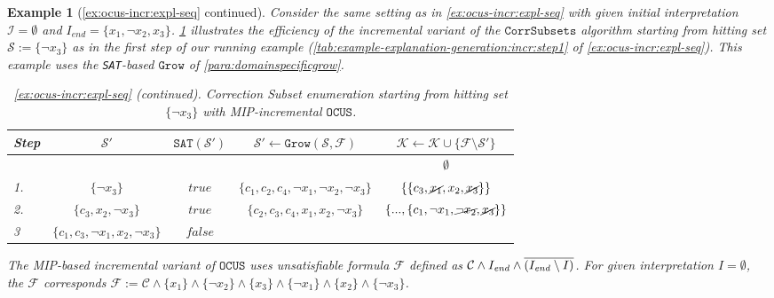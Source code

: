 \documentclass[twoside,11pt]{article}
\newcommand\m[1]{\mathcal{#1}}
\newtheorem{example}{Example}
\newcommand\Iend{\ensuremath{I_\mathit{end} }\xspace}
\newcommand\formula{\ensuremath{\m{F} }\xspace}
\newcommand\formulac{\ensuremath{\m{C} }\xspace}
\newcommand\mm[1]{\ensuremath{#1}\xspace}
\newcommand\call[1]{\mm{\texttt{#1}}}
\newcommand\sat{\texttt{{SAT}}\xspace}
\newcommand\grow{\mm{\call{Grow}}}
\newcommand\comus{\mm{\call{OCUS}}}
\newcommand\corrsubsets{\mm{\call{CorrSubsets}}}
\begin{document}
\begin{example}[\cref{ex:ocus-incr:expl-seq} continued] \label{ex:correction-subset-enum}
	Consider the same setting as in \cref{ex:ocus-incr:expl-seq} with given initial interpretation $\m{I} =\emptyset$ and $\Iend = \{x_1, \lnot x_2, x_3\}$.
	\cref{tab:example-corr-subsets:ocus-incr} illustrates the efficiency of the incremental variant of the \corrsubsets algorithm starting from hitting set $\m{S} := \{\lnot x_3\}$ as in the first step of our running example (\cref{tab:example-explanation-generation:incr:step1} of \cref{ex:ocus-incr:expl-seq}). This example uses the \sat-based \grow of \cref{para:domainspecificgrow}. 
	
	\begin{table}[!h]
		\centering
		\begin{tabular}{lcccc} 
			Step & $\m{S}'$                             & $\sat(\m{S}')$    & $\m{S}' \gets \grow(\m{S}, \formula)$      & $\m{K}  \gets \m{K}  \cup \{  \formula \setminus \m{S}'\}$ \\ 
			\toprule[2pt]
			&    \phantom{$\{ c_1, c_2, x_1, \lnot x_3 \}$}    &    &      & $\emptyset$                                \\\midrule
			1. & $\{ \lnot x_3\}$                    & $\mathit{true}$  & $\{c_1, c_2, c_4, \lnot x_1, \lnot x_2, \lnot x_3 \}$            & $\{ \{c_3, \cancel{x_1}, x_2, \cancel{x_3}\}\}$                                \\\midrule
			2. & $\{c_3, x_2, \lnot x_3\}$ & $\mathit{true}$  & $\{c_2 , c_3, c_4, x_1 , x_2, \lnot x_3 \}$ & $\{ ..., \{c_1, \lnot x_1, \cancel{\lnot x_2}, \cancel{x_3}\}\}$                               \\\midrule
			3 & $\{c_1, c_3, \lnot x_1, x_2, \lnot x_3\}$& $\mathit{false}$  &  &                       \\  
		\end{tabular}
		\caption{\textit{\cref{ex:ocus-incr:expl-seq} (continued)}. Correction Subset enumeration starting from hitting set $\{ \lnot x_3\}$ with \emph{MIP-incremental} \comus.}
		\label{tab:example-corr-subsets:ocus-incr}
	\end{table}

	The MIP-based incremental variant of \comus uses unsatisfiable formula \formula defined as $\formulac\land \textbf{\Iend} \land \overline{(\Iend\setminus I)}$. For given interpretation $I = \emptyset$, the $\formula$ corresponds $\formula := \formulac\land \{ x_1\}\land  \{\lnot x_2\}\land \{ x_3\}\land \{ \lnot x_1\}\land  \{ x_2\}\land \{ \lnot x_3\}$.


\end{example}
\end{document}
